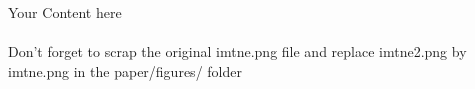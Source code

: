 Your Content here
\\
\\

Don't forget to scrap the original imtne.png file and replace imtne2.png by imtne.png in the paper/figures/ folder  